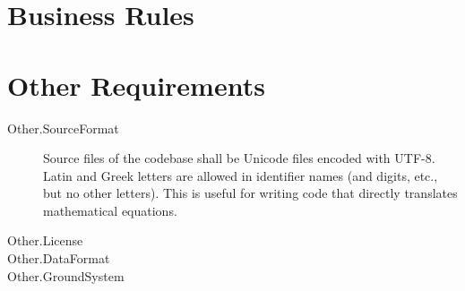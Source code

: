 \section{Business Rules}


\section{Other Requirements}


\begin{description}
\item[Other.SourceFormat] Source files of the codebase shall be Unicode files encoded with
  UTF-8. Latin and Greek letters are allowed in identifier names (and digits, etc., but no other
  letters). This is useful for writing code that directly translates mathematical equations.

\item[Other.License] 

\item[Other.DataFormat] 

\item[Other.GroundSystem] 
\end{description}
